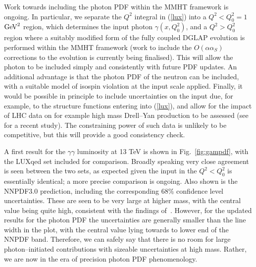 \documentclass{appolb}
\begin{document}
Work towards including the photon PDF within the MMHT framework is ongoing. In particular, we separate the $Q^2$ integral in (\ref{lux}) into a $Q^2<Q_0^2 = 1$ ${\rm GeV}^2$ region, which determines the input photon $\gamma(x,Q_0^2)$, and a $Q^2>Q_0^2$ region where a suitably modified form of the fully coupled DGLAP evolution is performed within the MMHT framework (work to include the $O(\alpha \alpha_S)$ corrections to the evolution is currently being finalised).  This will allow the photon to be included simply and consistently with future PDF updates. An additional advantage is that the photon PDF of the neutron can be included, with a suitable model of isospin violation at the input scale applied. Finally, it would be possible in principle to include uncertainties on the input due, for example, to the structure functions entering into (\ref{lux}), and allow for the impact of LHC data on for example high mass Drell--Yan production to be  assessed (see~\cite{Giuli:2017oii} for a recent study). The constraining power of such data is unlikely to be competitive, but this will provide a good consistency check.

A first result for the $\gamma\gamma$ luminosity at 13 TeV is shown in Fig.~\ref{fig:gampdf}, with the LUXqed set included for comparison. Broadly speaking very close agreement is seen between the two sets, as expected given the input in the $Q^2 < Q_0^2$ is essentially identical; a more precise comparison is ongoing. Also shown is the NNPDF3.0 prediction, including the corresponding 68\% confidence level uncertainties. These are seen to be very large at higher mass, with the central value being quite high, consistent with the findings of~\cite{Bourilkov:2016qum,Accomando:2016tah,Mangano:2016jyj,Pagani:2016caq}. However, for the updated results for the photon PDF the uncertainties are generally smaller than the line width in the plot, with the central value lying towards to lower end of the NNPDF band. Therefore, we can safely say that there is no room for large photon--initiated contributions with sizeable uncertainties at high mass. Rather, we are now in the era of precision photon PDF phenomenology.





%

\end{document}
